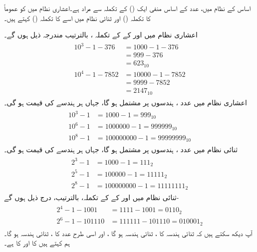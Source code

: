 اساس  کے نظام میں، عدد کے اساس منفی ایک () کے تکملہ سے مراد  ہے۔اعشاری نظام میں کو عموماً  کا تکملہ () اور ثنائی نظام میں اسے  کا تکملہ () کہتے ہیں۔
 
اعشاری نظام میں  اور  کے  کے تکملہ ، بالترتیب مندرجہ ذیل ہوں گے۔ 
\begin{gather}
\begin{aligned}
10^3-1-376&=1000-1-376\\
&=999-376\\
&=623_{10}\\
10^4-1-7852&=10000-1-7852\\
&=9999-7852\\
&=2147_{10}
\end{aligned}
\end{gather}
اعشاری نظام میں عدد  ،  ہندسوں پر مشتمل ہو گا، جہاں ہر ہندسے کی قیمت  ہو گی۔
\begin{gather}
\begin{aligned}
10^3-1&=1000-1=999_{10}\\
10^6-1&=1000000-1=999999_{10}\\
10^8-1&=100000000-1=99999999_{10}
\end{aligned}
\end{gather}
ثنائی نظام میں عدد  ،  ہندسوں پر مشتمل ہو گا، جہاں ہر ہندسے کی قیمت  ہو گی۔
\begin{gather}
\begin{aligned}
2^3-1&=1000-1=111_{2}\\
2^5-1&=100000-1=11111_{2}\\
2^8-1&=100000000-1=11111111_{2}
\end{aligned}
\end{gather}
 ثنائی نظام میں  اور  کے  کے تکملہ، بالترتیب، درج ذیل ہوں گے- 
\begin{gather}
\begin{aligned}
2^4-1-1001&=1111-1001=0110_2\\
2^6-1-101110&=111111-101110=010001_2
\end{aligned}
\end{gather}
آپ دیکھ سکتے ہیں کہ ثنائی ہندسہ  کا ، ثنائی ہندسہ  ہو گا ، اور اسی طرح عدد  کا ، ثنائی ہندسہ  ہو گا۔ ہم کہتے ہیں  کا  اور  کا  ہے۔


